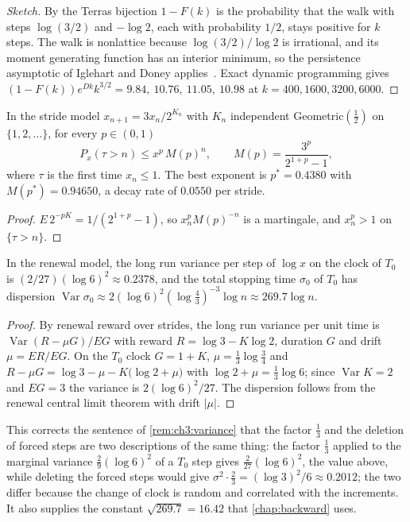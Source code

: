 \begin{proof}[Sketch]
By the Terras bijection $1-F(k)$ is the probability that the walk with steps $\log(3/2)$ and $-\log2$, each with probability $1/2$, stays positive for $k$ steps. The walk is nonlattice because $\log(3/2)/\log2$ is irrational, and its moment generating function has an interior minimum, so the persistence asymptotic of Iglehart and Doney applies~\cite{doney1989,iglehart1974}. Exact dynamic programming gives $(1-F(k))e^{Dk}k^{3/2}=9.84,\ 10.76,\ 11.05,\ 10.98$ at $k=400,1600,3200,6000$.
\end{proof}

\begin{proposition}\label{prop:ch20:tail}
In the stride model $x_{n+1}=3x_n/2^{K_n}$ with $K_n$ independent Geometric$(\frac12)$ on $\{1,2,\dots\}$, for every $p\in(0,1)$
\[
P_x(\tau>n)\le x^p\,M(p)^n,\qquad M(p)=\frac{3^p}{2^{1+p}-1},
\]
where $\tau$ is the first time $x_n\le1$. The best exponent is $p^\ast=0.4380$ with $M(p^\ast)=0.94650$, a decay rate of $0.0550$ per stride.
\end{proposition}

\begin{proof}
$E\,2^{-pK}=1/(2^{1+p}-1)$, so $x_n^pM(p)^{-n}$ is a martingale, and $x_n^p>1$ on $\{\tau>n\}$.
\end{proof}

\begin{proposition}\label{prop:ch20:var}
In the renewal model, the long run variance per step of $\log x$ on the clock of $T_0$ is $(2/27)(\log6)^2\approx0.2378$, and the total stopping time $\sigma_0$ of $T_0$ has dispersion $\operatorname{Var}\sigma_0\approx2(\log6)^2(\log\frac43)^{-3}\log n\approx269.7\log n$.
\end{proposition}

\begin{proof}
By renewal reward over strides, the long run variance per unit time is $\operatorname{Var}(R-\mu G)/EG$ with reward $R=\log3-K\log2$, duration $G$ and drift $\mu=ER/EG$. On the $T_0$ clock $G=1+K$, $\mu=\frac13\log\frac34$ and $R-\mu G=\log3-\mu-K\bigl(\log2+\mu\bigr)$ with $\log2+\mu=\frac13\log6$; since $\operatorname{Var}K=2$ and $EG=3$ the variance is $2(\log6)^2/27$. The dispersion follows from the renewal central limit theorem with drift $|\mu|$.
\end{proof}

This corrects the sentence of \cref{rem:ch3:variance} that the factor $\frac13$ and the deletion of forced steps are two descriptions of the same thing: the factor $\frac13$ applied to the marginal variance $\frac29(\log6)^2$ of a $T_0$ step gives $\frac2{27}(\log6)^2$, the value above, while deleting the forced steps would give $\sigma^2\cdot\frac23=(\log3)^2/6\approx0.2012$; the two differ because the change of clock is random and correlated with the increments. It also supplies the constant $\sqrt{269.7}=16.42$ that \cref{chap:backward} uses.

